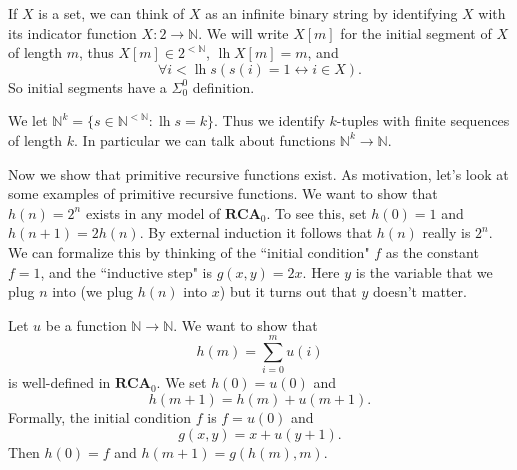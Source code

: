 \documentclass[12pt]{book}
\newcommand{\NN}{\mathbb{N}}
\DeclareMathOperator{\lh}{lh}
\newcommand{\RCA}{\mathbf{RCA}}
\theoremstyle{definition}
\newenvironment{example}
  {\pushQED{\qed}\renewcommand{\qedsymbol}{$\diamondsuit$}\examplex}
  {\popQED\endexamplex}
\begin{document}
If $X$ is a set, we can think of $X$ as an infinite binary string by identifying $X$ with its indicator function $X: 2 \to \NN$.
We will write $X[m]$ for the initial segment of $X$ of length $m$, thus $X[m] \in 2^{<\NN}$, $\lh X[m] = m$, and
$$\forall i<\lh s(s(i) = 1 \leftrightarrow i \in X).$$
So initial segments have a $\Sigma_0^0$ definition.

We let $\NN^k = \{s \in \NN^{<\NN}: \lh s = k\}$.
Thus we identify $k$-tuples with finite sequences of length $k$.
In particular we can talk about functions $\NN^k \to \NN$.

Now we show that primitive recursive functions exist.
As motivation, let's look at some examples of primitive recursive functions.
\begin{example}
We want to show that $h(n) = 2^n$ exists in any model of $\RCA_0$. To see this, set $h(0) = 1$ and $h(n+1) = 2h(n)$.
By external induction it follows that $h(n)$ really is $2^n$.
We can formalize this by thinking of the ``initial condition" $f$ as the constant $f = 1$, and the ``inductive step" is $g(x, y) = 2x$.
Here $y$ is the variable that we plug $n$ into (we plug $h(n)$ into $x$) but it turns out that $y$ doesn't matter.
\end{example}

\begin{example}
Let $u$ be a function $\NN \to \NN$.
We want to show that
$$h(m) = \sum_{i=0}^m u(i)$$
is well-defined in $\RCA_0$. We set $h(0) = u(0)$ and
$$h(m + 1) = h(m) + u(m + 1).$$
Formally, the initial condition $f$ is $f = u(0)$ and
$$g(x, y) = x + u(y + 1).$$
Then $h(0) = f$ and $h(m+1) = g(h(m), m)$.
\end{example}
\end{document}
